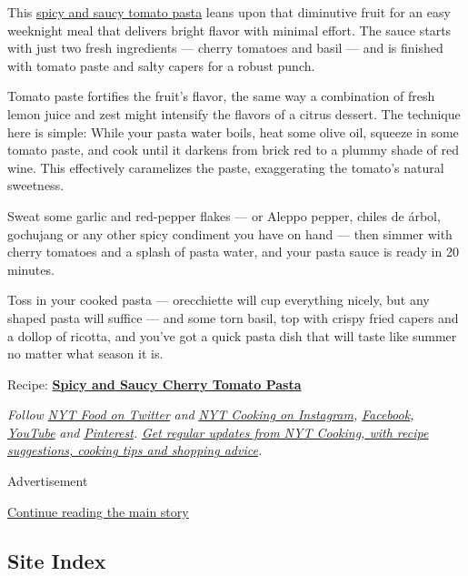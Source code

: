This
\href{https://cooking.nytimes3xbfgragh.onion/recipes/1020690-spicy-and-saucy-cherry-tomato-pasta}{spicy
and saucy tomato pasta} leans upon that diminutive fruit for an easy
weeknight meal that delivers bright flavor with minimal effort. The
sauce starts with just two fresh ingredients --- cherry tomatoes and
basil --- and is finished with tomato paste and salty capers for a
robust punch.

Tomato paste fortifies the fruit's flavor, the same way a combination of
fresh lemon juice and zest might intensify the flavors of a citrus
dessert. The technique here is simple: While your pasta water boils,
heat some olive oil, squeeze in some tomato paste, and cook until it
darkens from brick red to a plummy shade of red wine. This effectively
caramelizes the paste, exaggerating the tomato's natural sweetness.

Sweat some garlic and red-pepper flakes --- or Aleppo pepper, chiles de
árbol, gochujang or any other spicy condiment you have on hand --- then
simmer with cherry tomatoes and a splash of pasta water, and your pasta
sauce is ready in 20 minutes.

Toss in your cooked pasta --- orecchiette will cup everything nicely,
but any shaped pasta will suffice --- and some torn basil, top with
crispy fried capers and a dollop of ricotta, and you've got a quick
pasta dish that will taste like summer no matter what season it is.

Recipe:
\textbf{\href{https://cooking.nytimes3xbfgragh.onion/recipes/1020690-spicy-and-saucy-cherry-tomato-pasta}{Spicy
and Saucy Cherry Tomato Pasta}}

\emph{Follow} \href{https://twitter.com/nytfood}{\emph{NYT Food on
Twitter}} \emph{and}
\href{https://www.instagram.com/nytcooking/}{\emph{NYT Cooking on
Instagram}}\emph{,}
\href{https://www.facebookcorewwwi.onion/nytcooking/}{\emph{Facebook}}\emph{,}
\href{https://www.youtube.com/nytcooking}{\emph{YouTube}} \emph{and}
\href{https://www.pinterest.com/nytcooking/}{\emph{Pinterest}}\emph{.}
\href{https://www.nytimes3xbfgragh.onion/newsletters/cooking}{\emph{Get
regular updates from NYT Cooking, with recipe suggestions, cooking tips
and shopping advice}}\emph{.}

Advertisement

\protect\hyperlink{after-bottom}{Continue reading the main story}

\hypertarget{site-index}{%
\subsection{Site Index}\label{site-index}}

